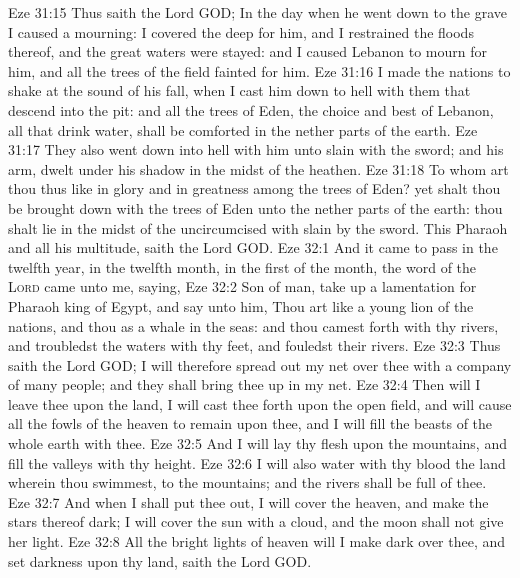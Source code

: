 \vs Eze 31:15 Thus saith the Lord GOD; In the day when he went down to the grave I caused a mourning: I covered the deep for him, and I restrained the floods thereof, and the great waters were stayed: and I caused Lebanon to mourn for him, and all the trees of the field fainted for him.
\vs Eze 31:16 I made the nations to shake at the sound of his fall, when I cast him down to hell with them that descend into the pit: and all the trees of Eden, the choice and best of Lebanon, all that drink water, shall be comforted in the nether parts of the earth.
\vs Eze 31:17 They also went down into hell with him unto  slain with the sword; and  his arm,  dwelt under his shadow in the midst of the heathen.
\vs Eze 31:18 To whom art thou thus like in glory and in greatness among the trees of Eden? yet shalt thou be brought down with the trees of Eden unto the nether parts of the earth: thou shalt lie in the midst of the uncircumcised with  slain by the sword. This  Pharaoh and all his multitude, saith the Lord GOD.
\vs Eze 32:1 And it came to pass in the twelfth year, in the twelfth month, in the first  of the month,  the word of the \textsc{Lord} came unto me, saying,
\vs Eze 32:2 Son of man, take up a lamentation for Pharaoh king of Egypt, and say unto him, Thou art like a young lion of the nations, and thou  as a whale in the seas: and thou camest forth with thy rivers, and troubledst the waters with thy feet, and fouledst their rivers.
\vs Eze 32:3 Thus saith the Lord GOD; I will therefore spread out my net over thee with a company of many people; and they shall bring thee up in my net.
\vs Eze 32:4 Then will I leave thee upon the land, I will cast thee forth upon the open field, and will cause all the fowls of the heaven to remain upon thee, and I will fill the beasts of the whole earth with thee.
\vs Eze 32:5 And I will lay thy flesh upon the mountains, and fill the valleys with thy height.
\vs Eze 32:6 I will also water with thy blood the land wherein thou swimmest,  to the mountains; and the rivers shall be full of thee.
\vs Eze 32:7 And when I shall put thee out, I will cover the heaven, and make the stars thereof dark; I will cover the sun with a cloud, and the moon shall not give her light.
\vs Eze 32:8 All the bright lights of heaven will I make dark over thee, and set darkness upon thy land, saith the Lord GOD.
